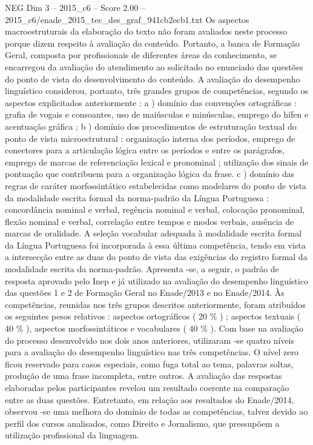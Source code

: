 \begin{textsample}{NEG Dim 3 – 2015\_c6 – Score 2.00 – 2015\_c6/enade\_2015\_tec\_des\_graf\_941cb2ecb1.txt}
Os aspectos macroestruturais da elaboração do texto não foram avaliados neste processo porque dizem respeito à avaliação do conteúdo.
Portanto, a banca de Formação Geral, composta por profissionais de diferentes áreas do conhecimento, se encarregou da avaliação do atendimento ao solicitado no enunciado das questões do ponto de vista do desenvolvimento do conteúdo.
A avaliação do desempenho linguístico considerou, portanto, três grandes grupos de competências, segundo os aspectos explicitados anteriormente : a ) domínio das convenções ortográficas : grafia de vogais e consoantes, uso de maiúsculas e minúsculas, emprego do hífen e acentuação gráfica ; b ) domínio dos procedimentos de estruturação textual do ponto de vista microestrutural : organização interna dos períodos, emprego de conectores para a articulação lógica entre os períodos e entre os parágrafos, emprego de marcas de referenciação lexical e pronominal ; utilização dos sinais de pontuação que contribuem para a organização lógica da frase. c ) domínio das regras de caráter morfossintático estabelecidas como modelares do ponto de vista da modalidade escrita formal da norma-padrão da Língua Portuguesa : concordância nominal e verbal, regência nominal e verbal, colocação pronominal, flexão nominal e verbal, correlação entre tempos e modos verbais, ausência de marcas de oralidade.
A seleção vocabular adequada à modalidade escrita formal da Língua Portuguesa foi incorporada à essa última competência, tendo em vista a intersecção entre as duas do ponto de vista das exigências do registro formal da modalidade escrita da norma-padrão.
Apresenta -se, a seguir, o padrão de resposta aprovado pelo Inep e já utilizado na avaliação do desempenho linguístico das questões 1 e 2 de Formação Geral no Enade/2013 e no Enade/2014.
Às competências, reunidas nos três grupos descritos anteriormente, foram atribuídos os seguintes pesos relativos : aspectos ortográficos ( 20 \% ) ; aspectos textuais ( 40 \% ), aspectos morfossintáticos e vocabulares ( 40 \% ).
Com base na avaliação do processo desenvolvido nos dois anos anteriores, utilizaram -se quatro níveis para a avaliação do desempenho linguístico nas três competências.
O nível zero ficou reservado para casos especiais, como fuga total ao tema, palavras soltas, produção de uma frase incompleta, entre outros.
A avaliação das respostas elaboradas pelos participantes revelou um resultado coerente na comparação entre as duas questões.
Entretanto, em relação aos resultados do Enade/2014, observou -se uma melhora do domínio de todas as competências, talvez devido ao perfil dos cursos analisados, como Direito e Jornalismo, que pressupõem a utilização profissional da linguagem.

\end{textsample}
